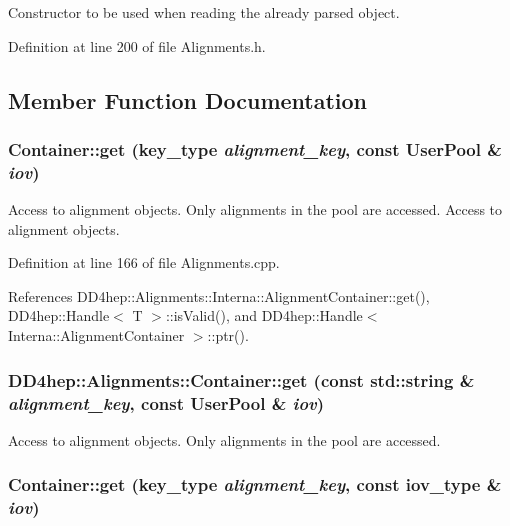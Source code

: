 Constructor to be used when reading the already parsed object. 

Definition at line 200 of file Alignments.h.

\subsection{Member Function Documentation}
\hypertarget{class_d_d4hep_1_1_alignments_1_1_container_a36da0db1c28a345f4363738dca05c023}{
\subsubsection[{get}]{ Container::get ({\bf key\_\-type} {\em alignment\_\-key}, \/  const UserPool \& {\em iov})}}
\label{class_d_d4hep_1_1_alignments_1_1_container_a36da0db1c28a345f4363738dca05c023}


Access to alignment objects. Only alignments in the pool are accessed. Access to alignment objects. 

Definition at line 166 of file Alignments.cpp.

References DD4hep::Alignments::Interna::AlignmentContainer::get(), DD4hep::Handle$<$ T $>$::isValid(), and DD4hep::Handle$<$ Interna::AlignmentContainer $>$::ptr().\hypertarget{class_d_d4hep_1_1_alignments_1_1_container_aea9d9f1fddacb999c394add07ff9fd67}{
\subsubsection[{get}]{ DD4hep::Alignments::Container::get (const std::string \& {\em alignment\_\-key}, \/  const UserPool \& {\em iov})}}
\label{class_d_d4hep_1_1_alignments_1_1_container_aea9d9f1fddacb999c394add07ff9fd67}


Access to alignment objects. Only alignments in the pool are accessed. \hypertarget{class_d_d4hep_1_1_alignments_1_1_container_a9ce366840ca326bf5258e6ac94537048}{
\subsubsection[{get}]{ Container::get ({\bf key\_\-type} {\em alignment\_\-key}, \/  const {\bf iov\_\-type} \& {\em iov})}}
\label{class_d_d4hep_1_1_alignments_1_1_container_a9ce366840ca326bf5258e6ac94537048}


